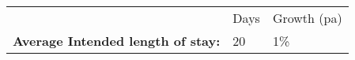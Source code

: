 \begin{tabular}[t]{p{4.8cm}>{\hfill}p{1.3cm}>{\hfill}p{1.4cm}}
   & Days & Growth (pa) \\ 
 \textbf{Average Intended length of stay:} & 20 & 1\% \\ 
  \end{tabular}
